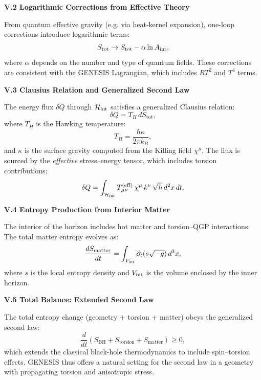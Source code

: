 \documentclass{article}
\begin{document}
\vspace{1em}
\noindent\textbf{V.2 Logarithmic Corrections from Effective Theory}

From quantum effective gravity (e.g. via heat-kernel expansion), one-loop corrections introduce logarithmic terms:
\begin{equation}
S_{\mathrm{tot}} \rightarrow S_{\mathrm{tot}} - \alpha \ln A_{\rm int},
\end{equation}
where $\alpha$ depends on the number and type of quantum fields. These corrections are consistent with the GENESIS Lagrangian, which includes $RT^2$ and $T^4$ terms.

\vspace{1em}
\noindent\textbf{V.3 Clausius Relation and Generalized Second Law}

The energy flux $\delta Q$ through $\mathcal H_{\rm int}$ satisfies a generalized Clausius relation:
\begin{equation}
\delta Q = T_H \, dS_{\mathrm{tot}},
\end{equation}
where $T_H$ is the Hawking temperature:
\begin{equation}
T_H = \frac{\hbar \kappa}{2\pi k_B},
\end{equation}
and $\kappa$ is the surface gravity computed from the Killing field $\chi^\mu$. The flux is sourced by the \emph{effective} stress–energy tensor, which includes torsion contributions:
\begin{equation}
\delta Q = \int_{\mathcal H_{\rm int}} T^{(\mathrm{eff})}_{\mu\nu} \, \chi^\mu \, k^\nu \, \sqrt{h} \, d^2x \, dt.
\end{equation}

\vspace{1em}
\noindent\textbf{V.4 Entropy Production from Interior Matter}

The interior of the horizon includes hot matter and torsion–QGP interactions. The total matter entropy evolves as:
\begin{equation}
\frac{dS_{\mathrm{matter}}}{dt} = \int_{V_{\rm int}} \partial_t(s \sqrt{-g}) \, d^3x,
\end{equation}
where $s$ is the local entropy density and $V_{\rm int}$ is the volume enclosed by the inner horizon.

\vspace{1em}
\noindent\textbf{V.5 Total Balance: Extended Second Law}

The total entropy change (geometry + torsion + matter) obeys the generalized second law:
\begin{equation}
\frac{d}{dt} (S_{\mathrm{BH}} + S_{\mathrm{torsion}} + S_{\mathrm{matter}}) \ge 0,
\end{equation}
which extends the classical black-hole thermodynamics to include spin–torsion effects. GENESIS thus offers a natural setting for the second law in a geometry with propagating torsion and anisotropic stress.
\end{document}
